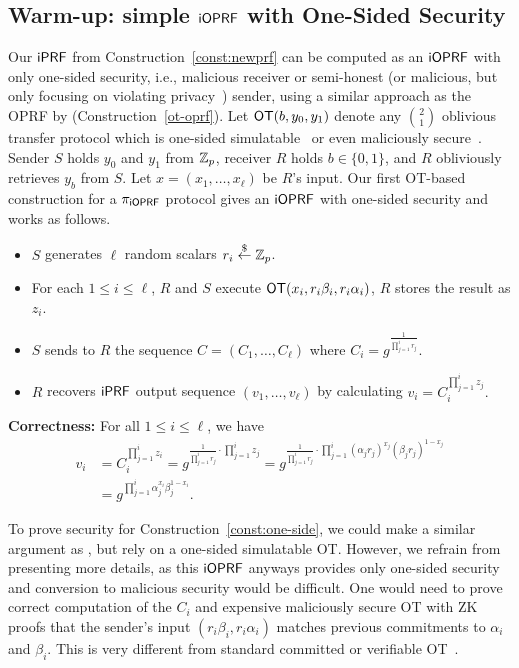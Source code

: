 \subsection{Warm-up: simple $\mathsf{i}\mathsf{OPRF}$ with One-Sided Security}
\label{sec:ot-ioprf}
Our $\mathsf{i}\mathsf{PRF}$ from Construction~\ref{const:newprf} can be computed as an
$\mathsf{i}\mathsf{OPRF}$ with only one-sided security, i.e., malicious receiver or
semi-honest (or malicious, but only focusing on violating
privacy~\cite{one-sided}) sender, using a similar approach as the OPRF
by \citeauthor{oprf} (Construction~\ref{ot-oprf}).  Let
$\mathsf{OT}(b, y_0, y_1)$ denote any $\binom{2}{1}$ oblivious transfer
protocol which is one-sided simulatable~\cite{one-sided} or even
maliciously secure~\cite{schneiderot,schollot}.  Sender $S$ holds
$y_0$ and $y_1$ from $\mathbb{Z}_p$, receiver $R$ holds $b\in\{0,1\}$, and $R$
obliviously retrieves $y_b$ from $S$. Let $x=(x_1,\ldots,x_\ell)$ be
$R$'s input.  Our first OT-based construction for a ${\pi_{\mathsf{i}\mathsf{OPRF}}}$ protocol
gives an $\mathsf{i}\mathsf{OPRF}$ with one-sided security and works as follows.

\begin{construction}
\label{const:one-side}
  \begin{itemize}
\item $S$ generates $\ell$ random scalars $r_i\stackrel{\$}{\leftarrow}\mathbb{Z}_p$.
\item For each $1 \leq i \leq \ell$, $R$ and $S$ execute $\mathsf{OT}(x_i, r_i\beta_i,r_i\alpha_i)$,  $R$ stores the result as $z_i$.
\item $S$ sends to $R$ the sequence $C=(C_1,\ldots,C_\ell)$ where
  $C_i = g^\frac{1}{\prod_{j=1}^{i} r_j}.$
\item $R$ recovers $\mathsf{i}\mathsf{PRF}$ output sequence $(v_1,\ldots,v_\ell)$ by calculating $v_i
  = C_i^{\prod_{j=1}^{i} z_j}.$
\end{itemize}
\end{construction}

{\bf Correctness:}  For all $1 \leq i \leq \ell$, we have
\begin{equation}
\begin{aligned}
v_i &= C_i^{\prod_{j=1}^{i} z_i} 
= g^{\frac{1}{\prod_{j=1}^{i} r_j} \cdot \prod_{j=1}^{i} z_j} 
= g^{\frac{1}{\prod_{j=1}^{i} r_j} \cdot \prod_{j=1}^{i} (\alpha_jr_j)^{x_j}(\beta_jr_j)^{1-x_j} } 
\\&= g^{\prod_{j=1}^{i} \alpha_j^{x_i}\beta_j^{1-x_i}}.
\end{aligned}
\end{equation}


To prove security for Construction~\ref{const:one-side}, we could make
a similar argument as \citet{oprf}, but rely on a one-sided
simulatable OT. However, we refrain from presenting more details, as
this $\mathsf{i}\mathsf{OPRF}$ anyways provides only one-sided security and conversion
to malicious security would be difficult. One would need to prove
correct computation of the $C_i$ and expensive maliciously secure OT
with ZK proofs that the sender's input $(r_i\beta_i,r_i\alpha_i)$
matches previous commitments to $\alpha_i$ and $\beta_i$. This is very
different from standard committed or verifiable
OT~\cite{commit-ot,verifot,commit-ot2}.



